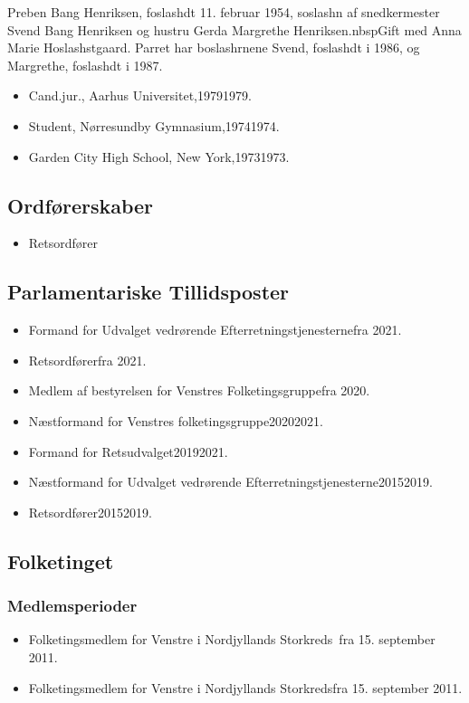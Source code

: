 \documentclass[11pt, a4paper]{awesome-cv}
\begin{document}
\makecvheader[R]
\makelettertitle
\begin{cvletter}
Preben Bang Henriksen, foslashdt 11. februar 1954, soslashn af snedkermester Svend Bang Henriksen og hustru Gerda Margrethe Henriksen.nbspGift med Anna Marie Hoslashstgaard. Parret har boslashrnene Svend, foslashdt i 1986, og Margrethe, foslashdt i 1987.

\begin{itemize}
\item Cand.jur., Aarhus Universitet,19791979.
\item Student, Nørresundby Gymnasium,19741974.
\item Garden City High School, New York,19731973.
\end{itemize}
\subsection*{Ordførerskaber}
\begin{itemize}
\item Retsordfører
\end{itemize}
\subsection*{Parlamentariske Tillidsposter}
\begin{itemize}
\item Formand for Udvalget vedrørende Efterretningstjenesternefra 2021.
\item Retsordførerfra 2021.
\item Medlem af bestyrelsen for Venstres Folketingsgruppefra 2020.
\item Næstformand for Venstres folketingsgruppe20202021.
\item Formand for Retsudvalget20192021.
\item Næstformand for Udvalget vedrørende Efterretningstjenesterne20152019.
\item Retsordfører20152019.
\end{itemize}
\subsection*{Folketinget}
\subsubsection*{Medlemsperioder}
\begin{itemize}
\item Folketingsmedlem for Venstre i Nordjyllands Storkreds fra 15. september 2011.
\item Folketingsmedlem for Venstre i Nordjyllands Storkredsfra 15. september 2011.
\end{itemize}

\end{cvletter}
\end{document}
